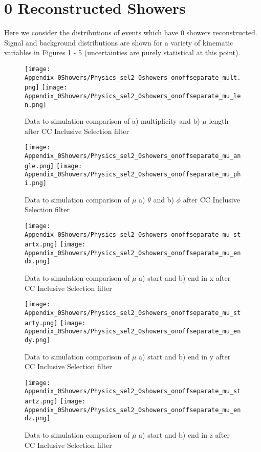 \clearpage
\appendix
\clearpage

\section{0 Reconstructed Showers}
\label{sec:AppC}
Here we consider the distributions of events which have 0 showers reconstructed. Signal and background distributions are shown for a variety of kinematic variables in Figures \ref{fig:physics_sel2_0shower_mulen} - \ref{fig:physics_sel2_0shower_z} (uncertainties are purely statistical at this point). 

\begin{figure}[h!]
\centering
\texttt{[image: Appendix\_0Showers/Physics\_sel2\_0showers\_onoffseparate\_mult.png]}
\hspace{2 mm}
\texttt{[image: Appendix\_0Showers/Physics\_sel2\_0showers\_onoffseparate\_mu\_len.png]}
\caption{ Data to simulation comparison of a) multiplicity and b) $\mu$ length after CC Inclusive Selection filter }
\label{fig:physics_sel2_0shower_mulen}
\end{figure}

\begin{figure}[h!]
\centering
\texttt{[image: Appendix\_0Showers/Physics\_sel2\_0showers\_onoffseparate\_mu\_angle.png]}
\hspace{2 mm}
\texttt{[image: Appendix\_0Showers/Physics\_sel2\_0showers\_onoffseparate\_mu\_phi.png]}
\caption{ Data to simulation comparison of $\mu$ a) $\theta$  and b) $\phi$ after CC Inclusive Selection filter }
\label{fig:physics_sel2_0shower_muphi}
\end{figure}

\begin{figure}[h!]
\centering
\texttt{[image: Appendix\_0Showers/Physics\_sel2\_0showers\_onoffseparate\_mu\_startx.png]}
\texttt{[image: Appendix\_0Showers/Physics\_sel2\_0showers\_onoffseparate\_mu\_endx.png]}
\caption{ Data to simulation comparison of $\mu$ a) start and b) end in x after CC Inclusive Selection filter }
\label{fig:physics_sel2_0shower_x}
\end{figure}

\begin{figure}[h!]
\centering
\texttt{[image: Appendix\_0Showers/Physics\_sel2\_0showers\_onoffseparate\_mu\_starty.png]}
\texttt{[image: Appendix\_0Showers/Physics\_sel2\_0showers\_onoffseparate\_mu\_endy.png]}
\caption{ Data to simulation comparison of $\mu$ a) start and b) end in y after CC Inclusive Selection filter }
\label{fig:physics_sel2_0shower_y}
\end{figure}

\begin{figure}[h!]
\centering
\texttt{[image: Appendix\_0Showers/Physics\_sel2\_0showers\_onoffseparate\_mu\_startz.png]}
\texttt{[image: Appendix\_0Showers/Physics\_sel2\_0showers\_onoffseparate\_mu\_endz.png]}
\caption{ Data to simulation comparison of $\mu$ a) start and b) end in z after CC Inclusive Selection filter }
\label{fig:physics_sel2_0shower_z}
\end{figure}
